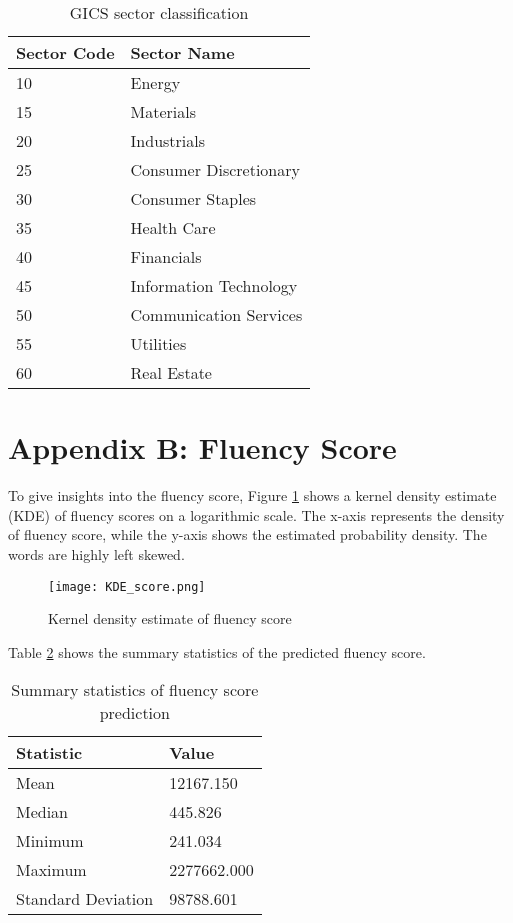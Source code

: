 \documentclass[a4paper,11pt]{report}
\begin{document}
\begin{table}[htbp]
\centering
\caption{GICS sector classification}
\label{tab:ggsector}
\begin{tabular}{ml}
\toprule
\textbf{Sector Code} & \textbf{Sector Name} \\
\midrule
10 & Energy \\
15 & Materials \\
20 & Industrials \\
25 & Consumer Discretionary \\
30 & Consumer Staples \\
35 & Health Care \\
40 & Financials \\
45 & Information Technology \\
50 & Communication Services \\
55 & Utilities \\
60 & Real Estate \\
\bottomrule
\end{tabular}
\end{table}
\newpage
\section*{Appendix B: Fluency Score}\label{Appendix B}
To give insights into the fluency score, Figure \ref{fig:word_freq} shows a kernel density estimate (KDE) of fluency scores on a logarithmic scale. The x-axis represents the density of
fluency score, while the y-axis shows the estimated probability density. The words
are highly left skewed. 

\begin{figure}[h!]
    \centering
    \texttt{[image: KDE\_score.png]}
    \caption{Kernel density estimate of fluency score}
    \label{fig:word_freq}
\end{figure}

Table \ref{tab:Score_stats} shows the summary statistics of the predicted fluency score. 

\begin{table}[htbp]
\centering
\caption{Summary statistics of fluency score prediction}
\label{tab:Score_stats}
\begin{tabular}{ll}
\toprule
\textbf{Statistic} & \textbf{Value} \\
\midrule
Mean & 12167.150 \\
Median & 445.826 \\
Minimum & 241.034 \\
Maximum & 2277662.000 \\
Standard Deviation & 98788.601 \\
\bottomrule
\end{tabular}
\end{table}
\newpage
\end{document}

